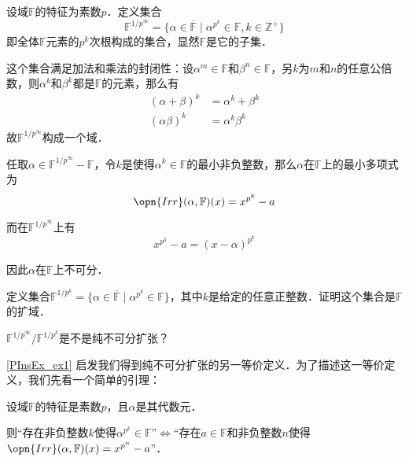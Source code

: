 \begin{example}{}\label{PInsEx_ex1}
设域$\mathbb{F}$的特征为素数$p$．定义集合
\begin{equation}
\mathbb{F}^{1/p^\infty} = \{\alpha\in\overline{\mathbb{F}}\mid \alpha^{p^k}\in\mathbb{F}, k\in\mathbb{Z}^+\}
\end{equation}
即全体$\mathbb{F}$元素的$p^k$次根构成的集合，显然$\mathbb{F}$是它的子集．

这个集合满足加法和乘法的封闭性：设$\alpha^m\in\mathbb{F}$和$\beta^n\in\mathbb{F}$，另$k$为$m$和$n$的任意公倍数，则$\alpha^k$和$\beta^k$都是$\mathbb{F}$的元素，那么有
\begin{equation}
\begin{aligned}
(\alpha+\beta)^k&=\alpha^k+\beta^k\\
(\alpha\beta)^k&=\alpha^k\beta^k
\end{aligned}
\end{equation}
故$\mathbb{F}^{1/p^\infty}$构成一个域．

任取$\alpha\in\mathbb{F}^{1/p^\infty}-\mathbb{F}$，令$k$是使得$\alpha^k\in\mathbb{F}$的最小非负整数，那么$\alpha$在$\mathbb{F}$上的最小多项式为
\begin{equation}
\opn{Irr}(\alpha, \mathbb{F})(x) = x^{p^k}-a
\end{equation}

而在$\mathbb{F}^{1/p^\infty}$上有
\begin{equation}
x^{p^k}-a = (x-\alpha)^{p^k}
\end{equation}

因此$\alpha$在$\mathbb{F}$上不可分．

\end{example}

\begin{exercise}{}
定义集合$\mathbb{F}^{1/p^k}=\{\alpha\in\overline{\mathbb{F}}\mid \alpha^{p^k}\in\mathbb{F}\}$，其中$k$是给定的任意正整数．证明这个集合是$\mathbb{F}$的扩域．

$\mathbb{F}^{1/p^\infty}/\mathbb{F}^{1/p^k}$是不是纯不可分扩张？
\end{exercise}

\autoref{PInsEx_ex1} 启发我们得到纯不可分扩张的另一等价定义．为了描述这一等价定义，我们先看一个简单的引理：

\begin{lemma}{}
设域$\mathbb{F}$的特征是素数$p$，且$\alpha$是其代数元．

则“存在非负整数$k$使得$\alpha^{p^k}\in\mathbb{F}$”$\iff$“存在$a\in\mathbb{F}$和非负整数$n$使得$\opn{Irr}(\alpha, \mathbb{F})(x) = x^{p^n}-a$”．

\end{lemma}

